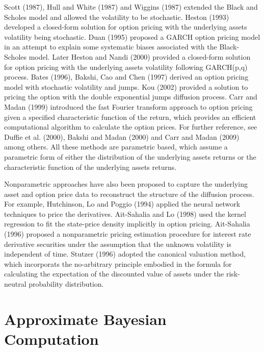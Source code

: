Scott (1987), Hull and White (1987) and Wiggins (1987) extended the
Black and Scholes model and allowed the volatility to be stochastic.
Heston (1993) developed a closed-form solution for option pricing
with the underlying assets volatility being stochastic. Duan (1995)
proposed a GARCH option pricing model in an attempt to explain some
systematic biases associated with the Black-Scholes model. Later Heston
and Nandi (2000) provided a closed-form solution for option pricing
with the underlying assets volatility following GARCH(p,q) process.
Bates (1996), Bakshi, Cao and Chen (1997) derived an option pricing
model with stochastic volatility and jumps. Kou (2002) provided a
solution to pricing the option with the double exponential jumps diffusion
process. Carr and Madan (1999) introduced the fast Fourier transform
approach to option pricing given a specified characteristic function
of the return, which provides an efficient computational algorithm
to calculate the option prices. For further reference, see Duffie
et al. (2000), Bakshi and Madan (2000) and Carr and Madan (2009) among
others. All these methods are parametric based, which assume a parametric
form of either the distribution of the underlying assets returns or
the characteristic function of the underlying assets returns. 

Nonparametric approaches have also been proposed to capture the underlying
asset and option price data to reconstruct the structure of the diffusion
process. For example, Hutchinson, Lo and Poggio (1994) applied the
neural network techniques to price the derivatives. Ait-Sahalia and
Lo (1998) used the kernel regression to fit the state-price density
implicitly in option pricing. Ait-Sahalia (1996) proposed a nonparametric
pricing estimation procedure for interest rate derivative securities
under the assumption that the unknown volatility is independent of
time. Stutzer (1996) adopted the canonical valuation method, which
incorporats the no-arbitrary principle embodied in the formula for
calculating the expectation of the discounted value of assets under
the risk-neutral probability distribution. %
\begin{comment}
add to bibiograph
\end{comment}



\section{Approximate Bayesian Computation}

